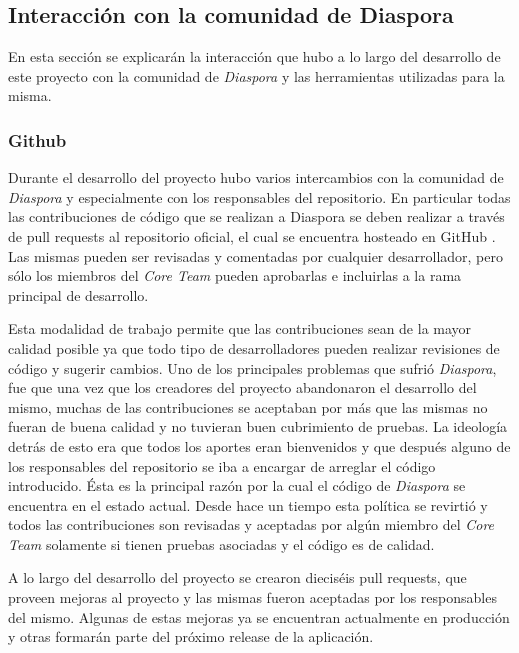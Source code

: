 \subsection{Interacción con la comunidad de Diaspora}

En esta sección se explicarán la interacción que hubo a lo largo del desarrollo de este proyecto con la comunidad de \emph{Diaspora} y las herramientas utilizadas para la misma.

\subsubsection{Github}

Durante el desarrollo del proyecto hubo varios intercambios con la comunidad de \emph{Diaspora} y especialmente con los responsables del repositorio. En particular todas las 
contribuciones de código que se realizan a Diaspora se deben realizar a través de pull requests al repositorio oficial, el cual se encuentra hosteado en GitHub \cite{github}. Las 
mismas pueden ser revisadas y comentadas por cualquier desarrollador, pero sólo los miembros del \emph{Core Team} pueden aprobarlas e incluirlas a la rama principal de 
desarrollo.

Esta modalidad de trabajo permite que las contribuciones sean de la mayor calidad posible ya que todo tipo de desarrolladores pueden realizar revisiones de código y sugerir 
cambios. Uno de los principales problemas que sufrió \emph{Diaspora}, fue que una vez que los creadores del proyecto abandonaron el desarrollo del mismo, muchas de las 
contribuciones se aceptaban por más que las mismas no fueran de buena calidad y no tuvieran buen cubrimiento de pruebas. La ideología detrás de esto era que todos los aportes eran 
bienvenidos y que después alguno de los responsables del repositorio se iba a encargar de arreglar el código introducido. Ésta es la principal razón por la cual el código de 
\emph{Diaspora} se encuentra en el estado actual. Desde hace un tiempo esta política se revirtió y todos las contribuciones son revisadas y aceptadas por algún miembro del 
\emph{Core Team} solamente si tienen pruebas asociadas y el código es de calidad.

A lo largo del desarrollo del proyecto se crearon dieciséis pull requests, que proveen mejoras al proyecto y las mismas fueron aceptadas por los responsables del mismo. Algunas de 
estas mejoras ya se encuentran actualmente en producción y otras formarán parte del próximo release de la aplicación.

